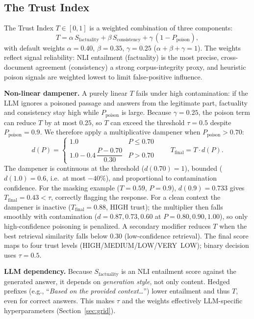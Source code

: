 \subsection{The Trust Index}
The Trust Index $T\in[0,1]$ is a weighted combination of three components:
\begin{equation}
\label{eq:trust}
T = \alpha\,S_{\text{factuality}} + \beta\,S_{\text{consistency}} + \gamma\,(1 - P_{\text{poison}}),
\end{equation}
with default weights $\alpha{=}0.40$, $\beta{=}0.35$, $\gamma{=}0.25$ ($\alpha{+}\beta{+}\gamma{=}1$). The weights reflect signal reliability: NLI entailment (factuality) is the most precise, cross-document agreement (consistency) a strong corpus-integrity proxy, and heuristic poison signals are weighted lowest to limit false-positive influence.

\textbf{Non-linear dampener.} A purely linear $T$ fails under high contamination: if the LLM ignores a poisoned passage and answers from the legitimate part, factuality and consistency stay high while $P_{\text{poison}}$ is large. Because $\gamma{=}0.25$, the poison term can reduce $T$ by at most $0.25$, so $T$ can exceed the threshold $\tau{=}0.5$ despite $P_{\text{poison}} {=}0.9$. We therefore apply a multiplicative dampener when $P_{\text{poison}}>0.70$:
\begin{equation}
\label{eq:damp}
d(P) =
\begin{cases}
1.0 & P \le 0.70\\[2pt]
1.0 - 0.4\,\dfrac{P-0.70}{0.30} & P > 0.70
\end{cases}
\qquad T_{\text{final}} = T\cdot d(P).
\end{equation}
The dampener is continuous at the threshold ($d(0.70){=}1$), bounded ($d(1.0){=}0.6$, i.e.\ at most $-40\%$), and proportional to contamination confidence. For the masking example ($T{=}0.59$, $P{=}0.9$), $d(0.9){=}0.733$ gives $T_{\text{final}}{=}0.43<\tau$, correctly flagging the response. For a clean context the dampener is inactive ($T_{\text{final}}{=}0.88$, HIGH trust); the multiplier then falls smoothly with contamination ($d{=}0.87, 0.73, 0.60$ at $P{=}0.80, 0.90, 1.00$), so only high-confidence poisoning is penalized. A secondary modifier reduces $T$ when the best retrieval similarity falls below $0.30$ (low-confidence retrieval). The final score maps to four trust levels (HIGH/MEDIUM/LOW/VERY~LOW); binary decision uses $\tau{=}0.5$.

\textbf{LLM dependency.} Because $S_{\text{factuality}}$ is an NLI entailment score against the generated answer, it depends on \emph{generation style}, not only content. Hedged prefixes (e.g., ``\emph{Based on the provided context\dots}'') lower entailment and thus $T$, even for correct answers. This makes $\tau$ and the weights effectively LLM-specific hyperparameters (Section~\ref{sec:grid}).
